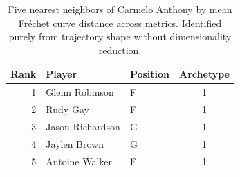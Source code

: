 \begin{table}[htbp]
  \centering\small
  \begin{tabular}{rllc}
    \toprule
    Rank & Player & Position & Archetype \\
    \midrule
    1 & Glenn Robinson & F & 1 \\
    2 & Rudy Gay & F & 1 \\
    3 & Jason Richardson & G & 1 \\
    4 & Jaylen Brown & G & 1 \\
    5 & Antoine Walker & F & 1 \\
    \bottomrule
  \end{tabular}
  \caption{Five nearest neighbors of Carmelo Anthony by mean Fr\'{e}chet curve distance across metrics. Identified purely from trajectory shape without dimensionality reduction.}
  \label{tab:Carmelo_Anthony_frechet_curve_neighbors}
\end{table}


